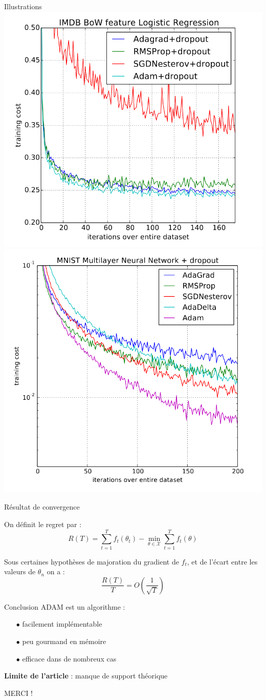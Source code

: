 \documentclass[11pt,aspectratio=169,xcolor=dvipsnames, french]{beamer}
\begin{document}
\begin{frame}{Illustrations}
 \includegraphics[width=0.45\linewidth]{../Images/IMDB_article.png}\hfill 
 \includegraphics[width=0.45\linewidth]{../Images/Multilayer.png} 
\end{frame}


\begin{frame}{Résultat de convergence}

On définit le regret par : $$R(T)=\sum_{t=1}^{T}f_t(\theta_t)-\min_{\theta\in\mathcal{X}}\sum_{t=1}^{T}f_t(\theta)$$

\begin{theorem}
  Sous certaines hypothèses de majoration du gradient de $f_t$, et de l'écart entre les valeurs de $\theta_n$ on a : 
    $$\frac{R(T)}{T}=O\left(\frac{1}{\sqrt{T}}\right)$$  
\end{theorem}

\end{frame}



\begin{frame}{Conclusion}
ADAM est un algorithme :  

\begin{itemize}
\item[$\bullet$] facilement implémentable 
\item[$\bullet$] peu gourmand en mémoire
\item[$\bullet$] efficace dans de nombreux cas
\end{itemize}


\textbf{Limite de l'article }: manque de support théorique

\end{frame}

\begin{frame}{}
\begin{center}
 \huge MERCI !
 \end{center}
\end{frame}
\end{document}
